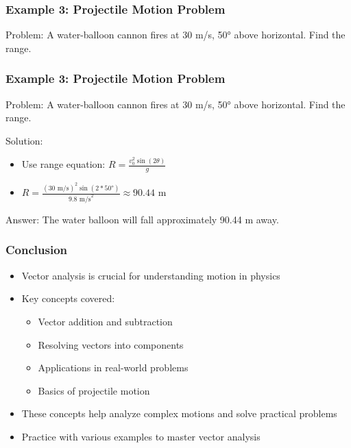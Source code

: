 \documentclass{beamer}
\begin{document}
\begin{frame}
\frametitle{Example 3: Projectile Motion Problem}
Problem: A water-balloon cannon fires at 30 m/s, 50° above horizontal. Find the range.

\end{frame}
\begin{frame}
\frametitle{Example 3: Projectile Motion Problem}
Problem: A water-balloon cannon fires at 30 m/s, 50° above horizontal. Find the range.

Solution:
\begin{itemize}
    \item Use range equation: $R = \frac{v_0^2 \sin(2\theta)}{g}$
    \item $R = \frac{(30 \text{ m/s})^2 \sin(2 * 50°)}{9.8 \text{ m/s}^2} \approx 90.44$ m
\end{itemize}
Answer: The water balloon will fall approximately 90.44 m away.
\end{frame}
\begin{frame}
\frametitle{Conclusion}
\begin{itemize}
    \item Vector analysis is crucial for understanding motion in physics
    \item Key concepts covered:
    \begin{itemize}
        \item Vector addition and subtraction
        \item Resolving vectors into components
        \item Applications in real-world problems
        \item Basics of projectile motion
    \end{itemize}
    \item These concepts help analyze complex motions and solve practical problems
    \item Practice with various examples to master vector analysis
\end{itemize}
\end{frame}
\end{document}
